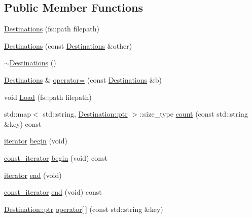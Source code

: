 \subsection*{Public Member Functions}
\begin{DoxyCompactItemize}
\item 
\hyperlink{class_photo_finish_1_1_destinations_a454613582d7aea38d96b835a1550e597}{Destinations} (fs\+::path filepath)
\item 
\hyperlink{class_photo_finish_1_1_destinations_a313eba1f3fb9da1c9fff50b255d5f00a}{Destinations} (const \hyperlink{class_photo_finish_1_1_destinations}{Destinations} \&other)
\item 
\hyperlink{class_photo_finish_1_1_destinations_ab809bba6c1fea56f171a94ce91fd3f4c}{$\sim$\+Destinations} ()
\item 
\hyperlink{class_photo_finish_1_1_destinations}{Destinations} \& \hyperlink{class_photo_finish_1_1_destinations_afc45abc75ba8e433c74b2be3e3d969e1}{operator=} (const \hyperlink{class_photo_finish_1_1_destinations}{Destinations} \&b)
\item 
void \hyperlink{class_photo_finish_1_1_destinations_a00b26ae3f504ad19f80b07486a2fc641}{Load} (fs\+::path filepath)
\item 
std\+::map$<$ std\+::string, \hyperlink{class_photo_finish_1_1_destination_a0d282a905cd81c3f0e6d7233c9bc7774}{Destination\+::ptr} $>$\+::size\+\_\+type \hyperlink{class_photo_finish_1_1_destinations_a7e7108f13b73dc445874779ed4ecf5d8}{count} (const std\+::string \&key) const
\item 
\hyperlink{class_photo_finish_1_1_destinations_adb2cf9240b0d2545643caa2c1d718913}{iterator} \hyperlink{class_photo_finish_1_1_destinations_a07d7c99b7abd5c43b6b53c17689780e8}{begin} (void)
\item 
\hyperlink{class_photo_finish_1_1_destinations_a267e114a259d98ae440074660c7086cb}{const\+\_\+iterator} \hyperlink{class_photo_finish_1_1_destinations_aaa8d1fbda8e89ec3e2c8aca5d77e9548}{begin} (void) const
\item 
\hyperlink{class_photo_finish_1_1_destinations_adb2cf9240b0d2545643caa2c1d718913}{iterator} \hyperlink{class_photo_finish_1_1_destinations_a023eba4bedf55d90fff1d0d723d942f9}{end} (void)
\item 
\hyperlink{class_photo_finish_1_1_destinations_a267e114a259d98ae440074660c7086cb}{const\+\_\+iterator} \hyperlink{class_photo_finish_1_1_destinations_a55aefa8640e5e04c2feb9f88a42504c6}{end} (void) const
\item 
\hyperlink{class_photo_finish_1_1_destination_a0d282a905cd81c3f0e6d7233c9bc7774}{Destination\+::ptr} \hyperlink{class_photo_finish_1_1_destinations_a93a9459dc194cc6511acc9c0ef948248}{operator\mbox{[}$\,$\mbox{]}} (const std\+::string \&key)
\end{DoxyCompactItemize}
